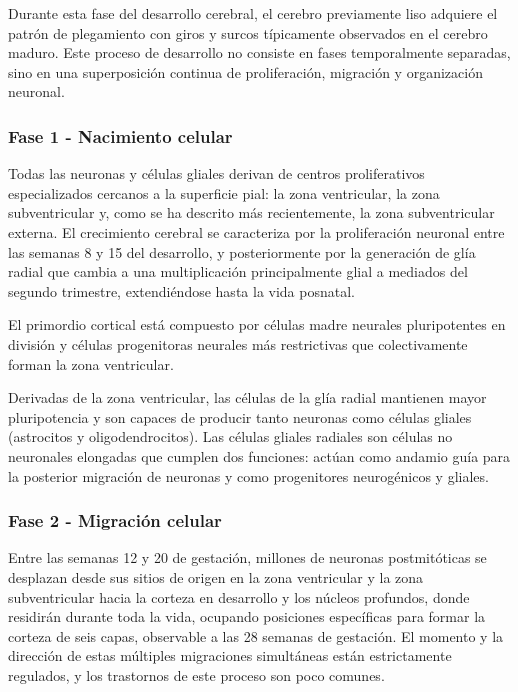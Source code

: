\documentclass[11pt,letterpaper]{report}
\begin{document}
Durante esta fase del desarrollo cerebral, el cerebro previamente liso adquiere
el patrón de plegamiento con giros y surcos típicamente observados en el
cerebro maduro. Este proceso de desarrollo no consiste en fases temporalmente
separadas, sino en una superposición continua de proliferación, migración y
organización neuronal. \cite{Gibb2018}

\subsubsection{Fase 1 - Nacimiento celular}
Todas las neuronas y células gliales derivan de centros proliferativos
especializados cercanos a la superficie pial: la zona ventricular, la zona
subventricular y, como se ha descrito más recientemente, la zona subventricular
externa. El crecimiento cerebral se caracteriza por la proliferación neuronal
entre las semanas 8 y 15 del desarrollo, y posteriormente por la generación de
glía radial que cambia a una multiplicación principalmente glial a mediados del
segundo trimestre, extendiéndose hasta la vida posnatal. \cite{Polin124} 

El primordio cortical está compuesto por células madre neurales pluripotentes
en división y células progenitoras neurales más restrictivas que colectivamente
forman la zona ventricular. \cite{Polin124}

Derivadas de la zona ventricular, las células de la glía radial mantienen mayor
pluripotencia y son capaces de producir tanto neuronas como células gliales
(astrocitos y oligodendrocitos). Las células gliales radiales son células no
neuronales elongadas que cumplen dos funciones: actúan como andamio guía para
la posterior migración de neuronas y como progenitores neurogénicos y gliales.
\cite{Polin124}

\subsubsection{Fase 2 - Migración celular}
Entre las semanas 12 y 20 de gestación, millones de neuronas postmitóticas se
desplazan desde sus sitios de origen en la zona ventricular y la zona
subventricular hacia la corteza en desarrollo y los núcleos profundos, donde
residirán durante toda la vida, ocupando posiciones específicas para formar la
corteza de seis capas, observable a las 28 semanas de gestación. El momento y
la dirección de estas múltiples migraciones simultáneas están estrictamente
regulados, y los trastornos de este proceso son poco comunes.
\cite{Polin124}
\end{document}
